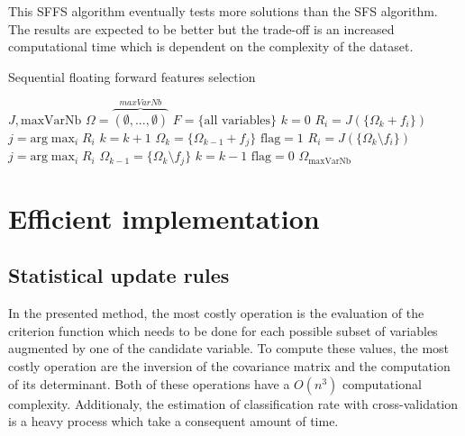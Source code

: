 \documentclass[journal,peerreview,onecolumn]{IEEEtran}
\begin{document}
        This SFFS algorithm eventually tests more solutions than the SFS algorithm. The results are expected to be better but the trade-off is an increased computational time which is dependent on the complexity of the dataset.

        \begin{algorithm}
        \caption{Sequential floating forward features selection\label{alg:sffs}}
        {\footnotesize
        \begin{algorithmic}[1]
        \REQUIRE $J,\text{maxVarNb}$
        \STATE $\Omega=\overbrace{(\emptyset,...,\emptyset)}^{maxVarNb}$
        \STATE $F=\text{\{all variables\}}$
        \STATE $k=0$
        \STATE $R_i = J(\{\Omega_k + f_i\})$
        \ENDFOR
        \STATE $j=\text{arg} \max_{i} R_i$
        \STATE $k=k+1$
        \STATE $\Omega_k = \{\Omega_{k-1} + f_j\}$
        \STATE $\text{flag}=1$
        \STATE $R_i = J(\{\Omega_k \setminus f_i\})$
        \ENDFOR
        \STATE $j=\text{arg} \max_{i} R_i$
        \STATE $\Omega_{k-1} = \{\Omega_k \setminus f_j\}$
        \STATE $k=k-1$
        \ELSE
        \STATE $\text{flag}=0$
        \ENDIF
        \ENDWHILE
        \ENDIF
        \ENDWHILE
        \RETURN $\Omega_{\text{maxVarNb}}$
        \end{algorithmic}
        }
        \end{algorithm}


\section{Efficient implementation}
\label{sec:implementation}

    \subsection{Statistical update rules}
    In the presented method, the most costly operation is the evaluation of the criterion function which needs to be done for each possible subset of variables augmented by one of the candidate variable. To compute these values, the most costly operation are the inversion of the covariance matrix and the computation of its determinant. Both of these operations have a $O(n^3)$ computational complexity. Additionaly, the estimation of classification rate with cross-validation is a heavy process which take a consequent amount of time.
\end{document}
